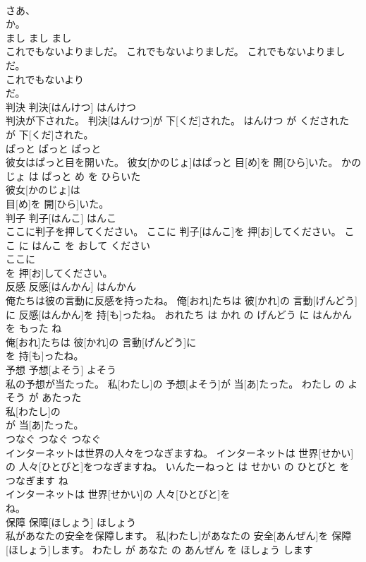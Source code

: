 \documentclass[8pt]{extreport}
\begin{document}
\begin{CJK}{UTF8}{min}
\\	さあ、
\\	か。			
\\	まし	まし	まし	
\\	これでもないよりましだ。	これでもないよりましだ。	これでもないよりましだ。	
\\	これでもないより
\\	だ。			
\\	判決	判決[はんけつ]	はんけつ	
\\	判決が下された。	判決[はんけつ]が 下[くだ]された。	はんけつ が くだされた	
\\	が 下[くだ]された。			
\\	ぱっと	ぱっと	ぱっと	
\\	彼女はぱっと目を開いた。	彼女[かのじょ]はぱっと 目[め]を 開[ひら]いた。	かのじょ は ぱっと め を ひらいた	
\\	彼女[かのじょ]は
\\	目[め]を 開[ひら]いた。			
\\	判子	判子[はんこ]	はんこ	
\\	ここに判子を押してください。	ここに 判子[はんこ]を 押[お]してください。	ここ に はんこ を おして ください	
\\	ここに
\\	を 押[お]してください。			
\\	反感	反感[はんかん]	はんかん	
\\	俺たちは彼の言動に反感を持ったね。	俺[おれ]たちは 彼[かれ]の 言動[げんどう]に 反感[はんかん]を 持[も]ったね。	おれたち は かれ の げんどう に はんかん を もった ね	
\\	俺[おれ]たちは 彼[かれ]の 言動[げんどう]に
\\	を 持[も]ったね。			
\\	予想	予想[よそう]	よそう	
\\	私の予想が当たった。	私[わたし]の 予想[よそう]が 当[あ]たった。	わたし の よそう が あたった	
\\	私[わたし]の
\\	が 当[あ]たった。			
\\	つなぐ	つなぐ	つなぐ	
\\	インターネットは世界の人々をつなぎますね。	インターネットは 世界[せかい]の 人々[ひとびと]をつなぎますね。	いんたーねっと は せかい の ひとびと を つなぎます ね	
\\	インターネットは 世界[せかい]の 人々[ひとびと]を
\\	ね。			
\\	保障	保障[ほしょう]	ほしょう	
\\	私があなたの安全を保障します。	私[わたし]があなたの 安全[あんぜん]を 保障[ほしょう]します。	わたし が あなた の あんぜん を ほしょう します	

\end{CJK}
\end{document}
